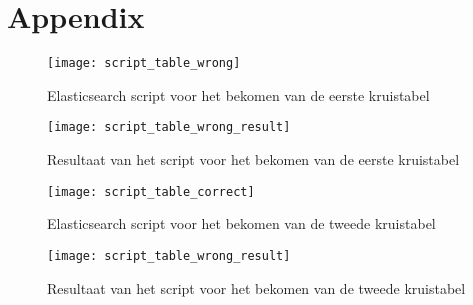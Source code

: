 \chapter{Appendix}
\label{ch:appendix}

\begin{figure}
	\centering
	\texttt{[image: script\_table\_wrong]}
	\caption{Elasticsearch script voor het bekomen van de eerste kruistabel}
	\label{app:eersteKruistabel}
\end{figure}

\begin{figure}
	\centering
	\texttt{[image: script\_table\_wrong\_result]}
	\caption{Resultaat van het script voor het bekomen van de eerste kruistabel}
	\label{app:eersteKruistabelResult}
\end{figure}

\begin{figure}
	\centering
	\texttt{[image: script\_table\_correct]}
	\caption{Elasticsearch script voor het bekomen van de tweede kruistabel}
	\label{app:tweedeKruistabel}
\end{figure}

\begin{figure}
	\centering
	\texttt{[image: script\_table\_wrong\_result]}
	\caption{Resultaat van het script voor het bekomen van de tweede kruistabel}
	\label{app:tweedeKruistabelResult}	
\end{figure}